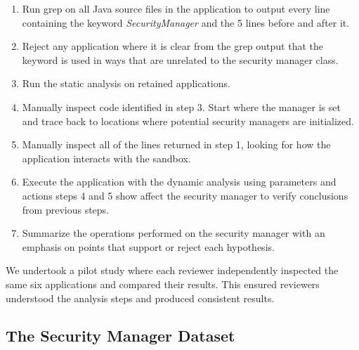 \documentclass{sig-alternate}
\begin{document}
\begin{enumerate}
\item Run grep on all Java source files in the application
to output every line containing the keyword \textsl{SecurityManager} and the 5 lines before and after it.
\item Reject any application where it is clear from the grep output that the keyword is used in ways that are unrelated to the security manager class.
\item Run the static analysis on retained applications. 
\item Manually inspect code identified in step 3.
Start where the manager is set and trace 
back to locations where potential security
managers are initialized. 
\item Manually inspect all of the lines returned in step 1, looking for how the application interacts with
the sandbox. 
\item Execute the application with the dynamic analysis using parameters
and actions steps 4 and 5 show affect the security
manager to verify conclusions from previous steps.
\item Summarize the operations performed
on the security manager with an emphasis on points that support or
reject each hypothesis.
\end{enumerate}

We undertook a pilot study where each reviewer
independently inspected the same six applications and compared their
results. This ensured reviewers understood the analysis steps and produced
consistent results.

\subsection{The Security Manager Dataset}\label{sec:Applications-Studied}
\end{document}
